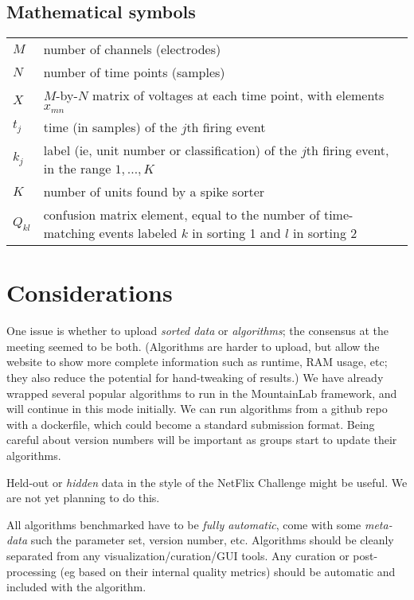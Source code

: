 \documentclass[10pt]{article}
\begin{document}
\subsection{Mathematical symbols}
\label{s:symb}

\begin{tabular}{ll}
  $M$ & number of channels (electrodes)\\
  $N$ & number of time points (samples)\\
  $X$ & $M$-by-$N$ matrix of voltages at each time point, with elements $x_{mn}$\\
  $t_j$ & time (in samples) of the $j$th firing event\\
  $k_j$ & label (ie, unit number or classification) of the $j$th firing event,
  in the range $1,\ldots,K$\\
  $K$ & number of units found by a spike sorter\\
  $Q_{kl}$ & confusion matrix element, equal to the
  number of time-matching events labeled $k$ in sorting 1 and $l$ in sorting 2\\
\end{tabular}




\section{Considerations}
\label{s:cons}

One issue is whether to upload {\em sorted data} or {\em algorithms};
the consensus at the meeting seemed to be both.
(Algorithms are harder to upload, but allow the website to show more complete
information such as runtime, RAM usage, etc; they also reduce the potential
for hand-tweaking of results.)
We have already wrapped several popular algorithms
to run in the MountainLab framework, and will continue in this
mode initially.
We can run algorithms from a github repo with a dockerfile, which
could become a standard submission format.
Being careful about version numbers will be important as groups
start to update their algorithms.

Held-out or {\em hidden} data in the style of the NetFlix Challenge might
be useful.
We are not yet planning to do this.

All algorithms benchmarked have to be {\em fully automatic},
come with some {\em meta-data} such the parameter set, version number, etc.
Algorithms should be cleanly separated from any visualization/curation/GUI tools.
Any curation or post-processing (eg based on their internal quality metrics)
should be automatic and included with the algorithm.
\end{document}
